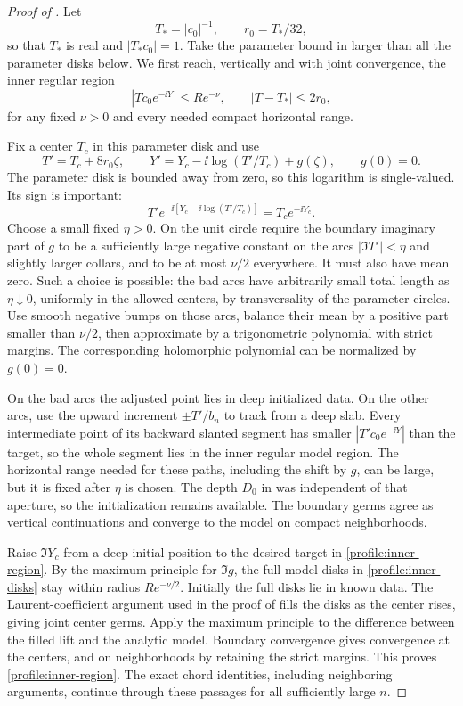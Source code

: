 \begin{proof}[Proof of ]
Let
\[
 T_* = |c_0|^{-1},\qquad r_0=T_*/32,
\]
so that \(T_*\) is real and \(|T_*c_0|=1\). Take the parameter
bound in  larger than all the parameter
disks below. We first reach, vertically and with joint convergence,
the inner regular region
\begin{equation}
 \label{profile:inner-region}
 |Tc_0e^{-\ii Y}|\le Re^{-\nu},\qquad
 |T-T_*|\le2r_0,
\end{equation}
for any fixed \(\nu>0\) and every needed compact horizontal range.

Fix a center \(T_c\) in this parameter disk and use
\begin{equation}
 \label{profile:inner-disks}
 T'=T_c+8r_0\zeta,\qquad
 Y'=Y_c-\ii\log(T'/T_c)+g(\zeta),\qquad g(0)=0.
\end{equation}
The parameter disk is bounded away from zero, so this logarithm is
single-valued. Its sign is important:
\[
 T'e^{-\ii[Y_c-\ii\log(T'/T_c)]}=T_ce^{-\ii Y_c}.
\]
Choose a small fixed \(\eta>0\). On the unit circle require the
boundary imaginary part of \(g\) to be a sufficiently large
negative constant on the arcs \(|\Im T'|<\eta\) and slightly
larger collars, and to be at most \(\nu/2\) everywhere. It must
also have mean zero. Such a choice is possible: the bad arcs have
arbitrarily small total length as \(\eta\downarrow0\), uniformly
in the allowed centers, by transversality of the parameter circles.
Use smooth negative bumps on those arcs, balance their mean by a
positive part smaller than \(\nu/2\), then approximate by a
trigonometric polynomial with strict margins. The corresponding
holomorphic polynomial can be normalized by \(g(0)=0\).

On the bad arcs the adjusted point lies in deep initialized data.
On the other arcs, use the upward increment \(\pm T'/b_n\) to
track from a deep slab. Every intermediate point of its backward
slanted segment has smaller \(|T'c_0e^{-\ii Y}|\) than the target,
so the whole segment lies in the inner regular model region. The
horizontal range needed for these paths, including the shift by
\(g\), can be large, but it is fixed after \(\eta\) is chosen.
The depth \(D_0\) in  was independent of
that aperture, so the initialization remains available. The boundary
germs agree as vertical continuations and converge to the model on
compact neighborhoods.

Raise \(\Im Y_c\) from a deep initial position to the desired
target in \eqref{profile:inner-region}. By the maximum principle for
\(\Im g\), the full model disks in \eqref{profile:inner-disks}
stay within radius \(Re^{-\nu/2}\). Initially the full disks lie
in known data. The Laurent-coefficient argument used in the proof of
 fills the disks as the center rises, giving
joint center germs. Apply the maximum principle to the difference
between the filled lift and the analytic model. Boundary convergence
gives convergence at the centers, and on neighborhoods by retaining
the strict margins. This proves \eqref{profile:inner-region}. The
exact chord identities, including neighboring arguments, continue
through these passages for all sufficiently large \(n\).


\end{proof}
